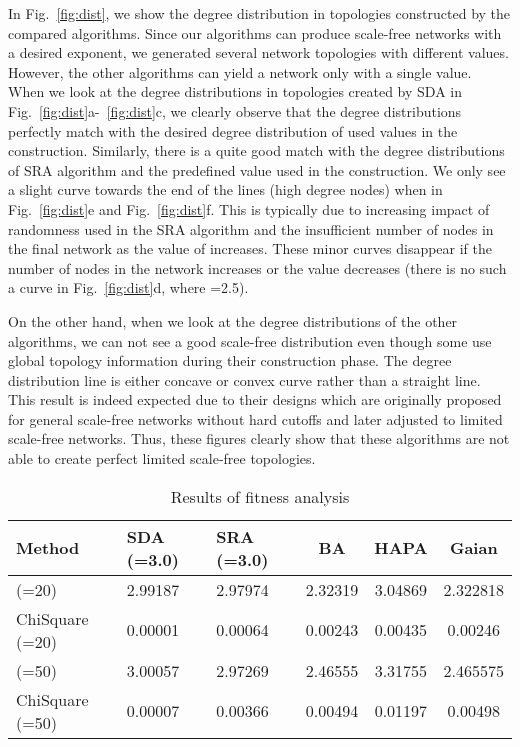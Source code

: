 \documentclass[10pt,journal,cspaper,compsoc]{IEEEtran}
\begin{document}
In Fig.~\ref{fig:dist}, we show the degree distribution in topologies constructed by the compared algorithms. Since our algorithms can produce scale-free networks with a desired  exponent, we generated several network topologies with different  values. However, the other algorithms can yield a network only with a single  value. When we look at the degree distributions in topologies created by SDA in Fig.~\ref{fig:dist}a-~\ref{fig:dist}c, we clearly observe that the degree distributions perfectly match with the desired degree distribution of used  values in the construction. Similarly, there is a quite good match with the degree distributions of SRA algorithm and the predefined  value used in the construction. We only see a slight curve towards the end of the lines (high degree nodes) when  in Fig.~\ref{fig:dist}e and Fig.~\ref{fig:dist}f. This is typically due to increasing impact of randomness used in the SRA algorithm and the insufficient number of nodes in the final network as the value of  increases. These minor curves disappear if the number of nodes in the network increases or the  value decreases (there is no such a curve in Fig.~\ref{fig:dist}d, where =2.5).  



On the other hand, when we look at the degree distributions of the other algorithms, we can not see a good scale-free distribution even though some use global topology information during their construction phase. The degree distribution line is either concave or convex curve rather than a straight line. This result is indeed expected due to their designs which are originally proposed for general scale-free networks without hard cutoffs and later adjusted to limited scale-free networks. Thus, these figures clearly show that these algorithms are not able to create perfect limited scale-free topologies.


\begin{table}[hbtp]
\begin{center}
\begin{tabular}{|p{1.2cm}|p{0.9cm}|p{0.9cm}|c|c|c|}
\hline Method & SDA (=3.0)  & SRA (=3.0) & BA & HAPA & Gaian \\ \hline \hline
 (=20) & 2.99187 & 2.97974 & 2.32319 & 3.04869 & 2.322818 \\ \hline
ChiSquare (=20) & 0.00001 & 0.00064 & 0.00243 & 0.00435 & 0.00246 \\ \hline
 (=50) &  3.00057 & 2.97269 & 2.46555 & 3.31755 & 2.465575 \\ \hline
ChiSquare (=50) & 0.00007 & 0.00366 & 0.00494 & 0.01197 & 0.00498 \\ \hline
\end{tabular}
\end{center}
\caption{Results of fitness analysis}
\label{table:mle}
\end{table}
\end{document}
